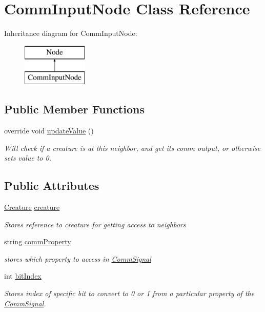 \hypertarget{class_comm_input_node}{}\section{Comm\+Input\+Node Class Reference}
\label{class_comm_input_node}
Inheritance diagram for Comm\+Input\+Node\+:\begin{figure}[H]
\begin{center}
\leavevmode
\includegraphics[height=2.000000cm]{class_comm_input_node}
\end{center}
\end{figure}
\subsection*{Public Member Functions}
\begin{DoxyCompactItemize}
\item 
override void \mbox{\hyperlink{class_comm_input_node_a22f5ea13329e77f47db18d28336cc52e}{update\+Value}} ()
\begin{DoxyCompactList}\small\item\em Will check if a creature is at this neighbor, and get it\textquotesingle{}s comm output, or otherwise sets value to 0. \end{DoxyCompactList}\end{DoxyCompactItemize}
\subsection*{Public Attributes}
\begin{DoxyCompactItemize}
\item 
\mbox{\hyperlink{class_creature}{Creature}} \mbox{\hyperlink{class_comm_input_node_ac72fbeea2e0341d3caaddd99f9a71cb6}{creature}}
\begin{DoxyCompactList}\small\item\em Stores reference to creature for getting access to neighbors \end{DoxyCompactList}\item 
string \mbox{\hyperlink{class_comm_input_node_a1a81a36b88a72dacb21af46740a3bfda}{comm\+Property}}
\begin{DoxyCompactList}\small\item\em stores which property to access in \mbox{\hyperlink{class_comm_signal}{Comm\+Signal}} \end{DoxyCompactList}\item 
int \mbox{\hyperlink{class_comm_input_node_a37287af65740dffcdb3c36630264ded8}{bit\+Index}}
\begin{DoxyCompactList}\small\item\em Stores index of specific bit to convert to 0 or 1 from a particular property of the \mbox{\hyperlink{class_comm_signal}{Comm\+Signal}}. \end{DoxyCompactList}\end{DoxyCompactItemize}


